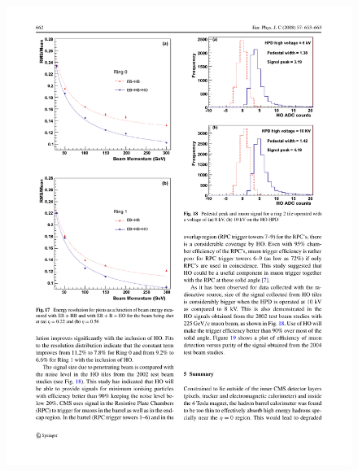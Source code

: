 \begin{figure}[hbtp]
  \begin{center}
    \includegraphics[width=1.2\cmsFigWidth]{figures/cms-hcal-performance1}

\end{center}
\end{figure}

